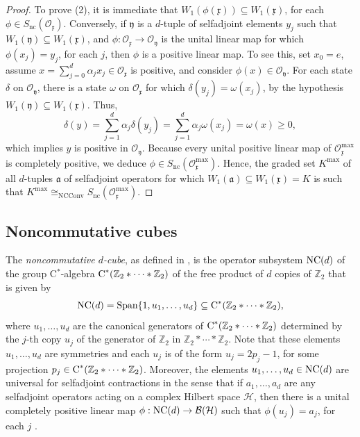 \documentclass{amsart}
\theoremstyle{definition}
\theoremstyle{remark}
\newcommand{\B}{\mathcal{B}}
\renewcommand{\H}{\mathcal{H}}
\newcommand\cstar{{\textrm C}^*}                              %
\numberwithin{equation}{section}
\begin{document}
\begin{proof}
To prove (2), it is immediate
that $W_1(\phi(\mathfrak x))\subseteq W_1(\mathfrak x)$, for each $\phi\in S_{\textrm{nc}}(\mathcal O_{\mathfrak x})$. Conversely, if $\mathfrak y$ is a $d$-tuple of selfadjoint elements $y_j$ such that
$W_1(\mathfrak y)\subseteq W_1(\mathfrak x)$, 
and $\phi:\mathcal O_{\mathfrak x}\rightarrow\mathcal O_{\mathfrak y}$ is the unital linear map for which $\phi(x_j)=y_j$, for each $j$, then $\phi$ is a positive linear map. To see this, set $x_0=e$, 
assume $x=\sum_{j=0}^d\alpha_jx_j\in\mathcal O_{\mathfrak x}$ is positive, and consider $\phi(x)\in \mathcal O_{\mathfrak y}$. For each state $\delta$ on
$\mathcal O_{\mathfrak y}$, there is a state $\omega$ on $\mathcal O_{\mathfrak x}$ for which $\delta(y_j)=\omega(x_j)$, by the hypothesis $W_1(\mathfrak y)\subseteq W_1(\mathfrak x)$. Thus,
\[
\delta(y)=\sum_{j=1}^d \alpha_j\delta(y_j) = \sum_{j=1}^d \alpha_j\omega(x_j) =\omega(x)\geq 0,
\]
which implies $y$ is positive in $\mathcal O_{\mathfrak y}$. Because every unital positive linear map of $\mathcal O_{\mathfrak x}^{\textrm{max}}$ is completely positive, we deduce
$\phi\in S_{\textrm{nc}}\left(\mathcal O_{\mathfrak x}^{\textrm{max}}\right)$. Hence, the graded set $K^{\textrm{max}}$ of all 
$d$-tuples $\mathfrak a$ of selfadjoint operators for which $W_1(\mathfrak a)\subseteq W_1(\mathfrak x)=K$ is such that
$K^{\textrm{max}}\cong_{\textrm{NCConv}} S_{\textrm{nc}}(\mathcal O_{\mathfrak x}^{\textrm{max}})$.
\end{proof}
 
\subsection{Noncommutative cubes}

The \emph{noncommutative $d$-cube},
as defined in \cite{farenick--kavruk--paulsen--todorov2014}, 
is the operator subsystem $\mbox{\textrm{NC}}(d)$ 
of the group C$^*$-algebra
$\cstar(\mathbb Z_2*\cdots* \mathbb Z_2)$ of the free product of $d$ copies of $\mathbb Z_2$ that is given by
\[
\mbox{\textrm{NC}}(d)=\mbox{Span}\{1,u_1,\dots,u_d\}\subseteq \cstar(\mathbb Z_2*\cdots* \mathbb Z_2),
\]
where $u_1,\dots,u_d$ are the canonical generators of $\cstar(\mathbb Z_2*\cdots* \mathbb Z_2)$ 
determined by the $j$-th copy $u_j$ of the generator of $\mathbb Z_2$
in $\mathbb Z_2*\cdots* \mathbb Z_2$. Note that these
elements $u_1,\dots,u_d$ are symmetries and each $u_j$ is of the form $u_j=2p_j-1$, for some
projection $p_j\in \cstar(\mathbb Z_2*\cdots* \mathbb Z_2)$. 
Moreover, the
elements $u_1,\dots,u_d\in \mbox{\textrm{NC}}(d)$ are universal for selfadjoint contractions 
in the sense that if $a_1,\dots,a_d$ are any selfadjoint operators acting on a complex Hilbert space $\H$, then there is a unital completely positive
linear map $\phi:\mbox{\textrm{NC}}(d)\rightarrow\B(\H)$ 
such that $\phi(u_j)=a_j$, for each $j$ \cite[Proposition 4.1]{farenick--kavruk--paulsen--todorov2018}.
\end{document}
